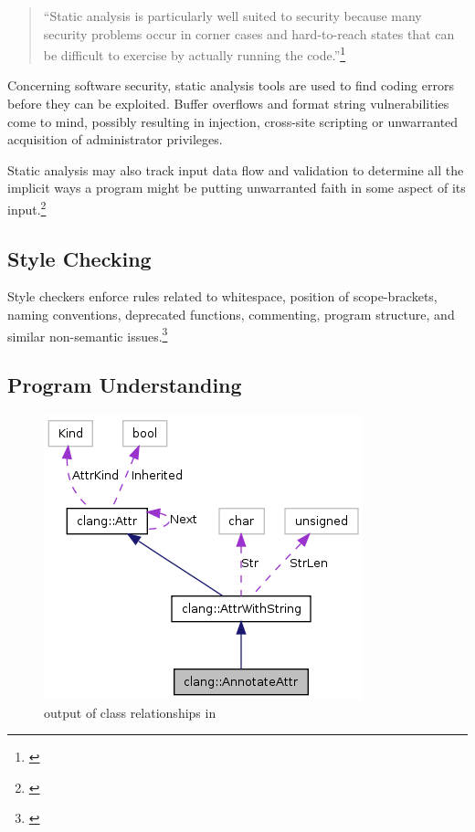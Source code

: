 \begin{quotation}
``Static analysis is particularly well suited to security because many security problems occur in corner cases and hard-to-reach states that can be difficult to exercise by actually running the code.''\footnote{\citep[4]{SecureProgramming}}
\end{quotation}

Concerning software security, static analysis tools are used to find coding errors before they can be exploited. Buffer overflows and format string vulnerabilities come to mind, possibly resulting in  injection, cross-site scripting or unwarranted acquisition of administrator privileges. 

Static analysis may also track input data flow and validation to determine
all the implicit ways a program might be putting unwarranted faith in some aspect of its input.\footnote{\citep[172]{SecureProgramming}}

\subsection{Style Checking}

Style checkers enforce rules related to whitespace, position of scope-brackets, naming conventions, deprecated functions, commenting, program structure, and similar non-semantic issues.\footnote{\citep[25]{SecureProgramming}}

\subsection{Program Understanding}

\begin{figure}
  \vspace{-20pt}
  \begin{center}
    \includegraphics[scale=0.5]{Images/ClangGraph.png}
  \end{center}
  \caption{ output of class relationships in }
  \label{fig:ClangGraph}
   \vspace{-15pt}
\end{figure}

